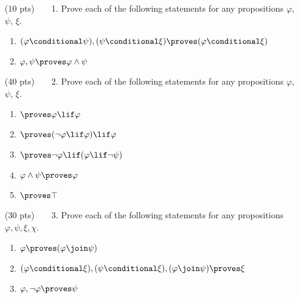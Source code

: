 \begin{enumerate}
  \item[(10 pts)~~~~1.]
    Prove each of the following statements for any propositions $\varphi$, $\psi$, $\xi$.
    \begin{enumerate}
      \item
        $(\varphi \conditional \psi), (\psi \conditional \xi) \proves (\varphi \conditional \xi)$%
      \item
        $\varphi, \psi \proves \varphi \land \psi$%
    \end{enumerate}
  \item[(40 pts)~~~~2.]
    Prove each of the following statements for any propositions $\varphi$, $\psi$, $\xi$.
    \begin{enumerate}
      \item
        $\proves \varphi \lif \varphi$
      \item
        $\proves (\neg \varphi \lif \varphi) \lif \varphi$%
      \item
        $\proves \neg \varphi \lif (\varphi \lif \neg \psi)$%
      \item
        $\varphi \land \psi \proves \varphi$%
      \item
        $\proves \top$%
    \end{enumerate}
  \item[(30 pts)~~~~3.]
    Prove each of the following statements for any propositions $\varphi, \psi, \xi, \chi$.
    \begin{enumerate}
      \item
        $\varphi \proves (\varphi \join \psi)$%
      \item
        $(\varphi \conditional \xi), (\psi \conditional \xi), (\varphi \join \psi) \proves \xi$%
      \item
        $\varphi, \neg \varphi \proves \psi$%

\end{enumerate}
\end{enumerate}

